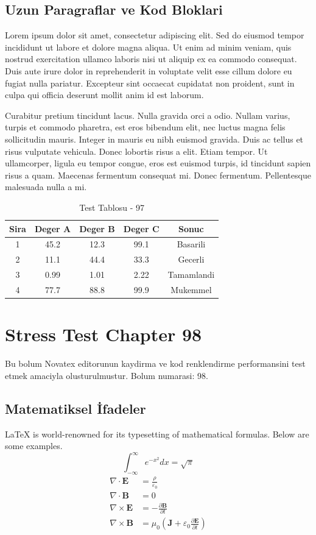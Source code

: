 \documentclass[12pt,a4paper]{article}
\begin{document}
\subsection{Uzun Paragraflar ve Kod Bloklari}
Lorem ipsum dolor sit amet, consectetur adipiscing elit. Sed do eiusmod tempor incididunt ut labore et dolore magna aliqua. Ut enim ad minim veniam, quis nostrud exercitation ullamco laboris nisi ut aliquip ex ea commodo consequat. Duis aute irure dolor in reprehenderit in voluptate velit esse cillum dolore eu fugiat nulla pariatur. Excepteur sint occaecat cupidatat non proident, sunt in culpa qui officia deserunt mollit anim id est laborum.

Curabitur pretium tincidunt lacus. Nulla gravida orci a odio. Nullam varius, turpis et commodo pharetra, est eros bibendum elit, nec luctus magna felis sollicitudin mauris. Integer in mauris eu nibh euismod gravida. Duis ac tellus et risus vulputate vehicula. Donec lobortis risus a elit. Etiam tempor. Ut ullamcorper, ligula eu tempor congue, eros est euismod turpis, id tincidunt sapien risus a quam. Maecenas fermentum consequat mi. Donec fermentum. Pellentesque malesuada nulla a mi.

\begin{table}[h!]
\centering
\begin{tabular}{|c|c|c|c|c|}
\hline
\textbf{Sira} & \textbf{Deger A} & \textbf{Deger B} & \textbf{Deger C} & \textbf{Sonuc} \\
\hline
1 & 45.2 & 12.3 & 99.1 & Basarili \\
2 & 11.1 & 44.4 & 33.3 & Gecerli \\
3 & 0.99 & 1.01 & 2.22 & Tamamlandi \\
4 & 77.7 & 88.8 & 99.9 & Mukemmel \\
\hline
\end{tabular}
\caption{Test Tablosu - 97}
\end{table}

\newpage
\section{Stress Test Chapter 98}
Bu bolum Novatex editorunun kaydirma ve kod renklendirme performansini test etmek amaciyla olusturulmustur. Bolum numarasi: 98.

\subsection{Matematiksel İfadeler}
\LaTeX{} is world-renowned for its typesetting of mathematical formulas. Below are some examples.
\begin{equation}
\int_{-\infty}^{\infty} e^{-x^2} dx = \sqrt{\pi}
\end{equation}
\begin{align}
\nabla \cdot \mathbf{E} &= \frac{\rho}{\varepsilon_0} \\
\nabla \cdot \mathbf{B} &= 0 \\
\nabla \times \mathbf{E} &= -\frac{\partial \mathbf{B}}{\partial t} \\
\nabla \times \mathbf{B} &= \mu_0\left(\mathbf{J} + \varepsilon_0 \frac{\partial \mathbf{E}}{\partial t}\right)
\end{align}
\end{document}
